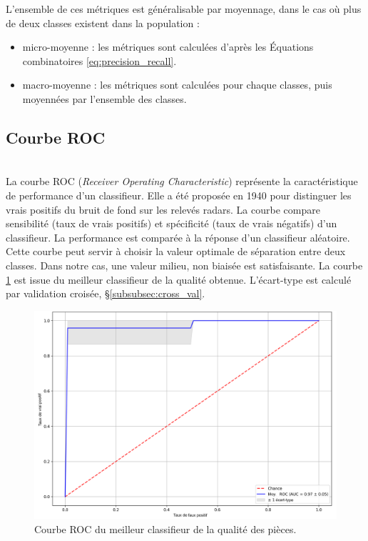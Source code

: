 L'ensemble de ces métriques est généralisable par moyennage, dans le cas où plus de deux classes existent dans la population :
\begin{itemize}
	\item micro-moyenne : les métriques sont calculées d'après les Équations combinatoires \ref{eq:precision_recall}.
	\item macro-moyenne : les métriques sont calculées pour chaque classes, puis moyennées par l'ensemble des classes.
\end{itemize}

\subsection{Courbe ROC}\mbox{} \label{subsec:roc} \\
La courbe ROC (\textit{Receiver Operating Characteristic}) représente la caractéristique de performance d'un classifieur.
Elle a été proposée en 1940 pour distinguer les vrais positifs du bruit de fond sur les relevés radars.
La courbe compare sensibilité (taux de vrais positifs) et spécificité (taux de vrais négatifs) d'un classifieur.
La performance est comparée à la réponse d'un classifieur aléatoire.
Cette courbe peut servir à choisir la valeur optimale de séparation entre deux classes.
Dans notre cas, une valeur milieu, non biaisée est satisfaisante.
La courbe \ref{fig:roc} est issue du meilleur classifieur de la qualité obtenue.
L'écart-type est calculé par validation croisée, §\ref{subsubsec:cross_val}.

\begin{figure}[hbtp]
	\centering
	\includegraphics[width=\textwidth,height=\textheight,keepaspectratio]{../Chap4/Figures/roc_images_all_224_3cams_densenet_conv4_PCA20.png}
	\caption{Courbe ROC du meilleur classifieur de la qualité des pièces.}
	\label{fig:roc}
\end{figure}

